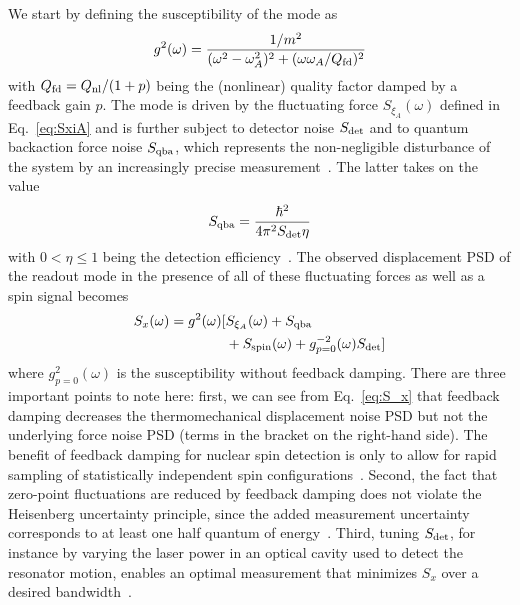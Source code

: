 We start by defining the susceptibility of the mode as
\begin{equation} \label{eq:susc_damped}
g^2(\omega) = \frac{1 / m^2}{(\omega^2 - \omega_A^2)^2 + (\omega \omega_A / Q_{\rm fd})^2}
\end{equation}
with $Q_{\rm fd} = Q_{\rm nl}/(1+p)$ being the (nonlinear) quality factor damped by a feedback gain $p$.
The mode is driven by the fluctuating force $S_{\xi_A}(\omega)$ defined in Eq.~\eqref{eq:SxiA} and is further subject to detector noise $S_{\rm det}$ and to quantum backaction force noise $S_{\rm qba}$, which represents the non-negligible disturbance of the system by an increasingly precise measurement~\cite{Courty_2001, Clerk_2010}. The latter takes on the value 
\begin{equation} \label{eq:S_ba}
S_{\rm qba} = \frac{\hbar^2}{4 \pi^2 S_{\rm det} \eta}
\end{equation}
with $0 < \eta \leq 1$ being the detection efficiency~\cite{Rossi_2018}. The observed displacement PSD of the readout mode in the presence of all of these fluctuating forces as well as a spin signal becomes~\cite{Poggio_2007, Rossi_2018}
\begin{equation} \label{eq:S_x}
\begin{split}
S_x(\omega) = g^2(\omega)[& S_{\xi_A}(\omega) + S_{\rm qba} \\& + S_{\rm spin}(\omega) + g_{p=0}^{-2}(\omega) S_{\rm det}]
\end{split}
\end{equation}
where $g_{p=0}^{2}(\omega)$ is the susceptibility without feedback damping. There are three important points to note here: first, we can see from Eq.~\eqref{eq:S_x} that feedback damping decreases the thermomechanical displacement noise PSD but not the underlying force noise PSD (terms in the bracket on the right-hand side). The benefit of feedback damping for nuclear spin detection is only to allow for rapid sampling of statistically independent spin configurations~\cite{Degen_2007}. Second, the fact that zero-point fluctuations are reduced by feedback damping does not violate the Heisenberg uncertainty principle, since the added measurement uncertainty corresponds to at least one half quantum of energy~\cite{Courty_2001, Rossi_2018}. Third, tuning $S_{\rm det}$, for instance by varying the laser power in an optical cavity used to detect the resonator motion, enables an optimal measurement that minimizes $S_x$ over a desired bandwidth~\cite{Clerk_2010}.

